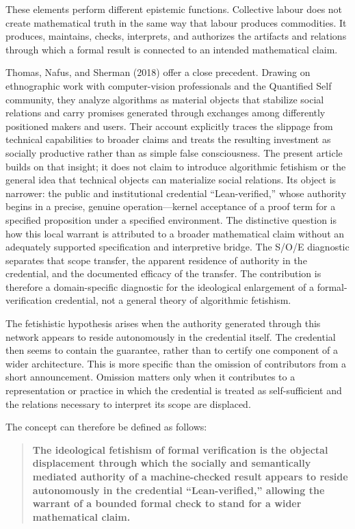 \documentclass[sn-apa]{sn-jnl}
\begin{document}
These elements perform different epistemic functions. Collective labour does not create mathematical truth in the same way that labour produces commodities. It produces, maintains, checks, interprets, and authorizes the artifacts and relations through which a formal result is connected to an intended mathematical claim.

Thomas, Nafus, and Sherman (2018) offer a close precedent. Drawing on ethnographic work with computer-vision professionals and the Quantified Self community, they analyze algorithms as material objects that stabilize social relations and carry promises generated through exchanges among differently positioned makers and users. Their account explicitly traces the slippage from technical capabilities to broader claims and treats the resulting investment as socially productive rather than as simple false consciousness. The present article builds on that insight; it does not claim to introduce algorithmic fetishism or the general idea that technical objects can materialize social relations. Its object is narrower: the public and institutional credential “Lean-verified,” whose authority begins in a precise, genuine operation—kernel acceptance of a proof term for a specified proposition under a specified environment. The distinctive question is how this local warrant is attributed to a broader mathematical claim without an adequately supported specification and interpretive bridge. The S/O/E diagnostic separates that scope transfer, the apparent residence of authority in the credential, and the documented efficacy of the transfer. The contribution is therefore a domain-specific diagnostic for the ideological enlargement of a formal-verification credential, not a general theory of algorithmic fetishism.

The fetishistic hypothesis arises when the authority generated through this network appears to reside autonomously in the credential itself. The credential then seems to contain the guarantee, rather than to certify one component of a wider architecture. This is more specific than the omission of contributors from a short announcement. Omission matters only when it contributes to a representation or practice in which the credential is treated as self-sufficient and the relations necessary to interpret its scope are displaced.

The concept can therefore be defined as follows:

\begin{quote}
\textbf{The ideological fetishism of formal verification is the objectal displacement through which the socially and semantically mediated authority of a machine-checked result appears to reside autonomously in the credential “Lean-verified,” allowing the warrant of a bounded formal check to stand for a wider mathematical claim.}
\end{quote}
\end{document}
